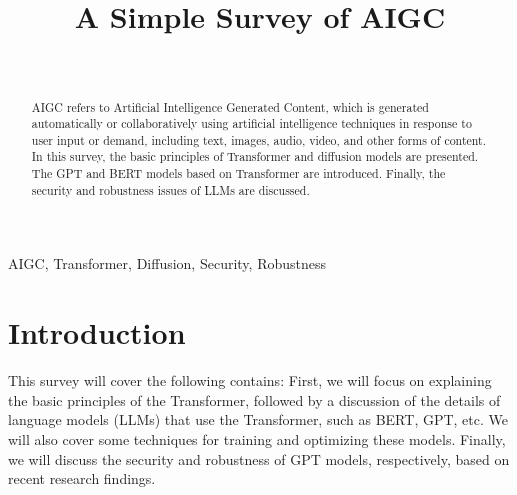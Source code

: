 \documentclass[conference]{IEEEtran}
\begin{document}
\title{A Simple Survey of AIGC\\
}

\author{\\
}

\maketitle

\begin{abstract}
AIGC refers to Artificial Intelligence Generated Content, 
which is generated automatically or collaboratively using 
artificial intelligence techniques in response to user input 
or demand, including text, images, audio, video, and other forms 
of content. In this survey, the basic principles of Transformer 
and diffusion models are presented. The GPT and BERT models 
based on Transformer are introduced. Finally, the security and robustness issues of LLMs are 
discussed.
\end{abstract}

\begin{IEEEkeywords}
AIGC, Transformer, Diffusion, Security, Robustness
\end{IEEEkeywords}

\section{Introduction}
This survey will cover the following contains: First, 
we will focus on explaining the basic principles of the Transformer\cite{b1}, 
followed by a discussion of the details of language models (LLMs) 
that use the Transformer, such as BERT\cite{b2}, GPT\cite{b3, b4, b5, b6}, etc. 
We will also cover some techniques for training and optimizing 
these models. 
Finally, we will discuss the security and 
robustness of GPT models, respectively, 
based on recent research findings.
\end{document}
